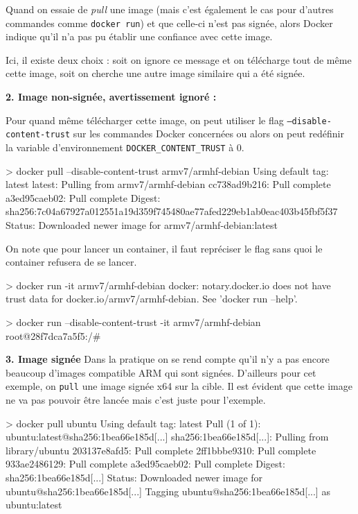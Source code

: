 \documentclass[11pt,a4paper,oneside]{report}
\newcommand{\code}[1]{\texttt{#1}}
\begin{document}
Quand on essaie de \textit{pull} une image (mais c'est également le cas pour d'autres commandes comme \code{docker run}) et que celle-ci n'est pas signée, alors Docker indique qu'il n'a pas pu établir une confiance avec cette image.

Ici, il existe deux choix : soit on ignore ce message et on télécharge tout de même cette image, soit on cherche une autre image similaire qui a été signée.

\textbf{2. Image non-signée, avertissement ignoré :}

Pour quand même télécharger cette image, on peut utiliser le flag \code{--disable-content-trust} sur les commandes Docker concernées ou alors on peut redéfinir la variable d'environnement \code{DOCKER\_CONTENT\_TRUST} à 0.

\begin{textcode}
> docker pull --disable-content-trust armv7/armhf-debian
Using default tag: latest
latest: Pulling from armv7/armhf-debian
cc738ad9b216: Pull complete 
a3ed95caeb02: Pull complete 
Digest: sha256:7c04a67927a012551a19d359f745480ae77afed229eb1ab0eac403b45fbf5f37
Status: Downloaded newer image for armv7/armhf-debian:latest
\end{textcode}

On note que pour lancer un container, il faut repréciser le flag sans quoi le container refusera de se lancer.

\begin{textcode}
> docker run -it armv7/armhf-debian
docker: notary.docker.io does not have trust data for docker.io/armv7/armhf-debian.
See 'docker run --help'.
\end{textcode}

\begin{textcode}
> docker run --disable-content-trust -it armv7/armhf-debian
root@28f7dca7a5f5:/# 
\end{textcode}

\textbf{3. Image signée}
Dans la pratique on se rend compte qu'il n'y a pas encore beaucoup d'images compatible ARM qui sont signées. D'ailleurs pour cet exemple, on \code{pull} une image signée x64 sur la cible. Il est évident que cette image ne va pas pouvoir être lancée mais c'est juste pour l'exemple.

\begin{textcode}
> docker pull ubuntu
Using default tag: latest
Pull (1 of 1): ubuntu:latest@sha256:1bea66e185d[...]
sha256:1bea66e185d[...]: Pulling from library/ubuntu
203137e8afd5: Pull complete 
2ff1bbbe9310: Pull complete 
933ae2486129: Pull complete 
a3ed95caeb02: Pull complete 
Digest: sha256:1bea66e185d[...]
Status: Downloaded newer image for ubuntu@sha256:1bea66e185d[...]
Tagging ubuntu@sha256:1bea66e185d[...] as ubuntu:latest
\end{textcode}
\end{document}
